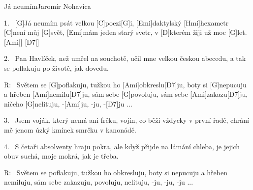 \begin{song}{Já neumím}{Jaromír Nohavica}

\begin{xverse}{1.~}
[\large G]Já neumím psát velkou [\large C]poezi[\large G]i,
[\large Emi]daktylský [\large Hmi]hexametr [\large C]není můj [\large G]svět,
[\large Emi]mám jeden starý svetr, v [\large D]kterém žiji
už moc [\large G]let. [\large Ami|]{} [\large D7|]{}
\end{xverse}

\begin{xverse}{2.~}
Pan Havlíček, než umřel na souchotě,
učil mne velkou českou abecedu,
a tak se poflakuju po životě,
jak dovedu.
\end{xverse}

\begin{xverse}{R:~}
Světem se [\large G]poflakuju, tužkou ho [\large Ami]obkreslu[\large D7]ju,
boty si [\large G]nepucuju a hřeben [\large Ami]nemilu[\large D7]ju,
sám sebe [\large G]povoluju, sám sebe [\large Ami]zakazu[\large D7]ju,
ničeho [\large G]nelituju, -[\large Ami]ju, -ju, -[\large D7]ju ...
\end{xverse}

\begin{xverse}{3.~}
Jsem voják, který nemá ani frčku,
vojín, co běží vždycky v první řadě,
chrání mě jenom úzký kmínek smrčku
v kanonádě.
\end{xverse}

\begin{xverse}{4.~}
S četaři absolventy hraju pokra,
ale když přijde na lámání chleba,
je jejich obuv suchá, moje mokrá,
jak je třeba.
\end{xverse}

\begin{xverse}{R:~}
Světem se poflakuju, tužkou ho obkresluju,
boty si nepucuju a hřeben nemiluju,
sám sebe zakazuju, povoluju, nelituju, -ju, -ju, -ju ...
\end{xverse}

\end{song}






